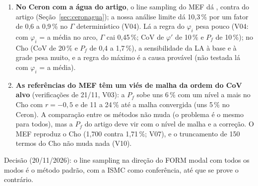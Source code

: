 \documentclass[11pt,a4paper]{article}
\begin{document}
\begin{enumerate}
    entre $\Gamma$ = 1,1 e 1,5, mas é curto demais para a $P_f$. A causa provável é a regra do máximo ($\varphi_i$ = o
    maior $\varphi$ do trecho), que lê a pequena escala do campo: os testes com os dados apontam nessa direção, mas o
    teste direto não foi rodado. O FORM não vê a diferença ($\beta$ quase iguais), e o MEF quase não a sente. O direto da
    LA com $r = -0{,}7$ ainda roda (números parciais). Com $r = 0$, a LA dá \lmDirZPf, contra \lmZmef{} do nosso MEF
    (V12) e 5,50\,\% do Ceron: em aberto.
  \item \textbf{No Ceron com a água do artigo}, o line sampling do MEF dá \ceaLsPf, contra \ceaPfArt{} do artigo
    (Seção~\ref{sec:ceronagua}); a nossa análise limite dá 10,3\,\% por um fator de 0,6 a 0,9\,\% no $\Gamma$
    determinístico (V04). Lá a regra do $\varphi_i$ pesa pouco (V04: com $\varphi_i$ = a média no arco, $\Gamma$ cai
    0,45\,\%; CoV de $\varphi'$ de 10\,\% e $P_f$ de 10\,\%); no Cho (CoV de 20\,\% e $P_f$ de 0,4 a 1,7\,\%), a
    sensibilidade da LA à base e à grade pesa muito, e a regra do máximo é a causa provável (não testada lá com
    $\varphi_i$ = a média).
  \item \textbf{As referências do MEF têm um viés de malha da ordem do CoV alvo} (verificações de 21/11, V03): a $P_f$
    sobe uns 6\,\% com um nível a mais no Cho com $r = -0{,}5$ e de 11 a 24\,\% até a malha convergida (uns 5\,\% no
    Ceron). A comparação entre os métodos não muda (o problema é o mesmo para todos), mas a $P_f$ do artigo deve vir com
    o nível de malha e a correção. O MEF reproduz o Cho (1,700 contra 1,71\,\%; V07), e o truncamento de 150 termos do
    Cho não muda nada (V10).
\end{enumerate}
Decisão (20/11/2026): o line sampling na direção do FORM modal com todos os modos é o método padrão, com a ISMC como
conferência, até que se prove o contrário.
\end{document}
